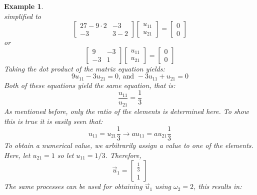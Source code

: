 \documentclass[12pt,letter]{article}
\newtheorem{ex}{Example}
\numberwithin{ex}{section} %
\newenvironment{example}{\begin{mdframed}[middlelinewidth=0.5mm]\begin{ex}\normalfont}{\end{ex}\end{mdframed}}
\numberwithin{re}{section} %
\begin{document}
\begin{example}
\begin{equation}
\end{equation}
simplified to
\begin{equation}
	 \begin{bmatrix} 27-9\cdot 2 & -3 \\    -3  & 3-2 \end{bmatrix} 
	 \begin{bmatrix} u_{11}\\ u_{21}\end{bmatrix}=\begin{bmatrix} 0\\ 0\end{bmatrix}
\end{equation}
or
\begin{equation}
	 \begin{bmatrix} 9 & -3 \\    -3  & 1 \end{bmatrix} 
	 \begin{bmatrix} u_{11}\\ u_{21}\end{bmatrix}=\begin{bmatrix} 0\\ 0\end{bmatrix}
\end{equation}
Taking the dot product of the matrix equation yields:
\begin{equation}
	9u_{11} -3u_{21}=0 \text{, and } -3u_{11} + u_{21}=0
\end{equation}
Both of these equations yield the same equation, that is:
\begin{equation}
	\frac{u_{11}}{u_{21}} =\frac{1}{3}
\end{equation}
As mentioned before, only the ratio of the elements is determined here. To show this is true it is easily seen that:
\begin{equation}
	u_{11}=u_{21}\frac{1}{3} \rightarrow  a u_{11}= a u_{21}\frac{1}{3} 
\end{equation}
To obtain a numerical value, we arbitrarily assign a value to one of the elements. Here, let $u_{21}=1$ so  let $u_{11}=1/3$. Therefore, 
\begin{equation}
	 \vec{u}_1 = \begin{bmatrix} \frac{1}{3}\\ 1\end{bmatrix}
\end{equation}
The same processes can be used for obtaining $\vec{u}_1$ using $\omega_2=2$, this results in:
\begin{equation}

\end{equation}
\end{example}
\end{document}
